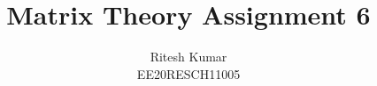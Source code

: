 \documentclass[journal,12pt,twocolumn]{IEEEtran}
\DeclareMathOperator*{\Res}{Res}
\begin{document}
	
	
	\newtheorem{theorem}{Theorem}[section]
	\newtheorem{problem}{Problem}
	\newtheorem{proposition}{Proposition}[section]
	\newtheorem{lemma}{Lemma}[section]
	\newtheorem{corollary}[theorem]{Corollary}
	\newtheorem{example}{Example}[section]
	\newtheorem{definition}[problem]{Definition}
	
	\newcommand{\BEQA}{\begin{eqnarray}}
	\newcommand{\EEQA}{\end{eqnarray}}
	\newcommand{\define}{\stackrel{\triangle}{=}}
	
	\providecommand{\mbf}{\mathbf}
	\providecommand{\pr}[1]{\ensuremath{\Pr\left(#1\right)}}
	\providecommand{\qfunc}[1]{\ensuremath{Q\left(#1\right)}}
	\providecommand{\sbrak}[1]{\ensuremath{{}\left[#1\right]}}
	\providecommand{\lsbrak}[1]{\ensuremath{{}\left[#1\right.}}
	\providecommand{\rsbrak}[1]{\ensuremath{{}\left.#1\right]}}
	\providecommand{\brak}[1]{\ensuremath{\left(#1\right)}}
	\providecommand{\lbrak}[1]{\ensuremath{\left(#1\right.}}
	\providecommand{\rbrak}[1]{\ensuremath{\left.#1\right)}}
	\providecommand{\cbrak}[1]{\ensuremath{\left\{#1\right\}}}
	\providecommand{\lcbrak}[1]{\ensuremath{\left\{#1\right.}}
	\providecommand{\rcbrak}[1]{\ensuremath{\left.#1\right\}}}
	\theoremstyle{remark}
	\newtheorem{rem}{Remark}
	\newcommand{\sgn}{\mathop{\mathrm{sgn}}}
	\providecommand{\abs}[1]{\left\vert#1\right\vert}
	\providecommand{\res}[1]{\Res\displaylimits_{#1}} 
	\providecommand{\norm}[1]{\left\lVert#1\right\rVert}
	\providecommand{\mtx}[1]{\mathbf{#1}}
	\providecommand{\mean}[1]{E\left[ #1 \right]}
	\providecommand{\fourier}{\overset{\mathcal{F}}{ \rightleftharpoons}}
	\providecommand{\system}{\overset{\mathcal{H}}{ \longleftrightarrow}}
	\newcommand{\solution}{\noindent \textbf{Solution: }}
	\newcommand{\cosec}{\,\text{cosec}\,}
	\providecommand{\dec}[2]{\ensuremath{\overset{#1}{\underset{#2}{\gtrless}}}}
	\newcommand{\myvec}[1]{\ensuremath{\begin{pmatrix}#1\end{pmatrix}}}
	\newcommand{\mydet}[1]{\ensuremath{\begin{vmatrix}#1\end{vmatrix}}}
	\makeatletter
	\makeatother
	\let\StandardTheFigure\thefigure
	\let\vec\mathbf
	\renewcommand{\thefigure}{\theproblem}
	\def\putbox#1#2#3{\makebox[0in][l]{\makebox[#1][l]{}\raisebox{\baselineskip}[0in][0in]{\raisebox{#2}[0in][0in]{#3}}}}
	\def\rightbox#1{\makebox[0in][r]{#1}}
	\def\centbox#1{\makebox[0in]{#1}}
	\def\topbox#1{\raisebox{-\baselineskip}[0in][0in]{#1}}
	\def\midbox#1{\raisebox{-0.5\baselineskip}[0in][0in]{#1}}
	\vspace{3cm}
	\title{Matrix Theory Assignment 6}
	\author{Ritesh Kumar \\ EE20RESCH11005}
	
\end{document}

